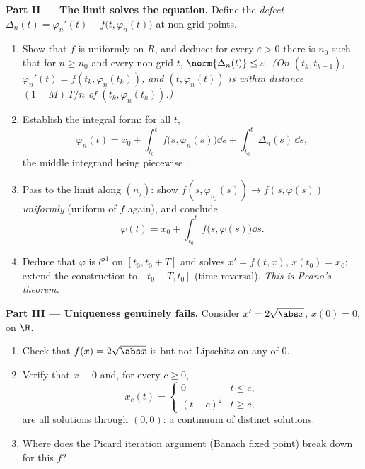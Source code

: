 \begin{problem}[{Weekend problem --- existence of solutions of
$x' = f(t, x)$ without Lipschitz}]
\medskip
\noindent\textbf{Part II --- The limit solves the equation.}
Define the \emph{defect} $\Delta_n(t) = \varphi_n'(t) -
f\bigl(t, \varphi_n(t)\bigr)$ at non-grid points.
\begin{enumerate}[resume]
  \item Show that $f$ is uniformly  on $R$, and
        deduce: for every $\varepsilon > 0$ there is $n_0$ such
        that for $n \geq n_0$ and every non-grid $t$,
        $\norm{\Delta_n(t)} \leq \varepsilon$. \emph{(On $(t_k,
        t_{k+1})$, $\varphi_n'(t) = f(t_k, \varphi_n(t_k))$,
        and $(t, \varphi_n(t))$ is within distance
        $(1 + M)\,T/n$ of $(t_k, \varphi_n(t_k))$.)}
  \item Establish the integral form: for all $t$,
        \[
        \varphi_n(t) = x_0 + \int_{t_0}^{t}
        f\bigl(s, \varphi_n(s)\bigr)\dd s +
        \int_{t_0}^t \Delta_n(s)\,\dd s,
        \]
        the middle integrand being piecewise .
  \item Pass to the limit along $(n_j)$: show
        $f(s, \varphi_{n_j}(s)) \to f(s, \varphi(s))$
        \emph{uniformly} (uniform  of $f$ again), and
        conclude
        \[
        \varphi(t) = x_0 + \int_{t_0}^t
        f\bigl(s, \varphi(s)\bigr)\dd s .
        \]
  \item Deduce that $\varphi$ is $\mathcal C^1$ on $[t_0, t_0 +
        T]$ and solves $x' = f(t, x)$, $x(t_0) = x_0$; extend
        the construction to $[t_0 - T, t_0]$ (time reversal).
        \emph{This is Peano's theorem.}
\end{enumerate}

\medskip
\noindent\textbf{Part III --- Uniqueness genuinely fails.}
Consider $x' = 2\sqrt{\abs x}$, $x(0) = 0$, on $\R$.
\begin{enumerate}[resume]
  \item Check that $f(x) = 2\sqrt{\abs x}$ is  but
        not Lipschitz on any  of $0$.
  \item Verify that $x \equiv 0$ and, for every $c \geq 0$,
        \[
        x_c(t) = \begin{cases} 0 & t \leq c,\\ (t - c)^2 & t
        \geq c,\end{cases}
        \]
        are all solutions through $(0,0)$: a continuum of
        distinct solutions.
  \item Where does the Picard iteration argument (Banach fixed
        point) break down for this $f$?
\end{enumerate}


\end{problem}
